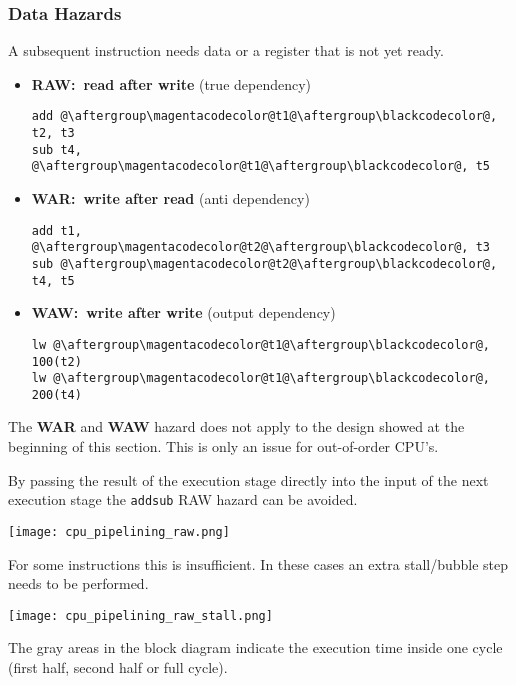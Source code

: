 \begin{multicols*}{3}
    \subsubsection{Data Hazards}\label{data hazards}

    A subsequent instruction needs data or a register that is not yet ready.

    \begin{itemize}
        \item \textbf{RAW:\ read after write} (true dependency)
              \begin{lstlisting}[escapechar=@]
add @\aftergroup\magentacodecolor@t1@\aftergroup\blackcodecolor@, t2, t3
sub t4, @\aftergroup\magentacodecolor@t1@\aftergroup\blackcodecolor@, t5
\end{lstlisting}
        \item \textbf{WAR:\ write after read} (anti dependency)
              \begin{lstlisting}[escapechar=@]
add t1, @\aftergroup\magentacodecolor@t2@\aftergroup\blackcodecolor@, t3
sub @\aftergroup\magentacodecolor@t2@\aftergroup\blackcodecolor@, t4, t5
\end{lstlisting}
        \item \textbf{WAW:\ write after write} (output dependency)
              \begin{lstlisting}[escapechar=@]
lw @\aftergroup\magentacodecolor@t1@\aftergroup\blackcodecolor@, 100(t2)
lw @\aftergroup\magentacodecolor@t1@\aftergroup\blackcodecolor@, 200(t4)
\end{lstlisting}
    \end{itemize}

    The \textbf{WAR} and \textbf{WAW} hazard does not apply to the design showed at the beginning of this section. This is only an issue for out-of-order CPU's.

    \newpar{}

    By passing the result of the execution stage directly into the input of the next execution stage the \texttt{add}\textleftarrow\texttt{sub} RAW hazard can be avoided.

    \texttt{[image: cpu\_pipelining\_raw.png]}

    For some instructions this is insufficient. In these cases an extra stall/bubble step needs to be performed.

    \texttt{[image: cpu\_pipelining\_raw\_stall.png]}

    The gray areas in the block diagram indicate the execution time inside one cycle (first half, second half or full cycle).


\end{multicols*}
